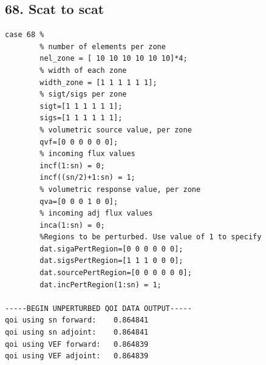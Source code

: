 \documentclass{article}
\begin{document}
\subsection{68. Scat to scat}
\begin{verbatim}
case 68 %
        % number of elements per zone
        nel_zone = [ 10 10 10 10 10 10]*4;
        % width of each zone
        width_zone = [1 1 1 1 1 1];
        % sigt/sigs per zone
        sigt=[1 1 1 1 1 1];
        sigs=[1 1 1 1 1 1];
        % volumetric source value, per zone
        qvf=[0 0 0 0 0 0];
        % incoming flux values
        incf(1:sn) = 0;
        incf((sn/2)+1:sn) = 1;
        % volumetric response value, per zone
        qva=[0 0 0 1 0 0];
        % incoming adj flux values
        inca(1:sn) = 0;
        %Regions to be perturbed. Use value of 1 to specify
        dat.sigaPertRegion=[0 0 0 0 0 0];
        dat.sigsPertRegion=[1 1 1 0 0 0];
        dat.sourcePertRegion=[0 0 0 0 0 0];
        dat.incPertRegion(1:sn) = 1; 
        
-----BEGIN UNPERTURBED QOI DATA OUTPUT----- 
qoi using sn forward: 	 0.864841 
qoi using sn adjoint: 	 0.864841 
qoi using VEF forward: 	 0.864839 
qoi using VEF adjoint: 	 0.864839 
\end{verbatim}
\end{document}
